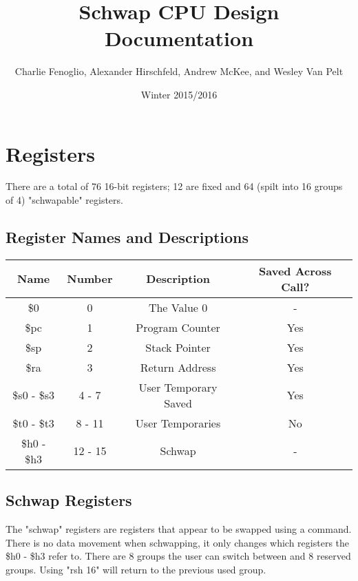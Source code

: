 \documentclass{article}
\title{Schwap CPU Design Documentation}
\author{Charlie Fenoglio, Alexander Hirschfeld, Andrew McKee, and Wesley Van Pelt}
\date{Winter 2015/2016}
\begin{document}
\maketitle
\section{Registers}
	There are a total of 76 16-bit registers; 12 are fixed and 64 (spilt into 16 groups of 4) "schwapable" registers.

	\subsection{Register Names and Descriptions}
		\begin{center}
			\begin{tabular}{| c | c | c | c |}
				\hline
				    Name        & Number  & Description      & Saved Across Call? \\ \hline
				    \$0         & 0       & The Value 0      & -   \\ \hline
				    \$pc        & 1       & Program Counter  & Yes \\ \hline
				    \$sp        & 2       & Stack Pointer    & Yes \\ \hline
				    \$ra        & 3       & Return Address   & Yes \\ \hline
				    \$s0 - \$s3 & 4 - 7   & User Temporary Saved & Yes \\ \hline
				    \$t0 - \$t3 & 8 - 11  & User Temporaries & No  \\ \hline
				    \$h0 - \$h3 & 12 - 15 & Schwap           & -   \\
				\hline
			\end{tabular}
		\end{center}
	\subsection{Schwap Registers}
		The "schwap" registers are registers that appear to be swapped using a command.  There is no data movement when schwapping, it only changes which registers the \$h0 - \$h3 refer to.  There are 8 groups the user can switch between and 8 reserved groups.  Using "rsh 16" will return to the previous used group.
\end{document}
